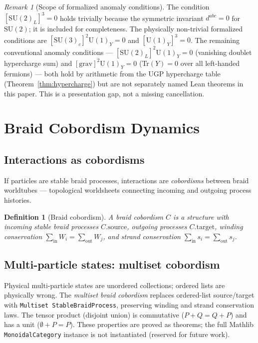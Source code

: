 \documentclass[12pt]{article}
\newtheorem{definition}[theorem]{Definition}
\theoremstyle{remark}
\newtheorem{remark}[theorem]{Remark}
\begin{document}
\begin{remark}[Scope of formalized anomaly conditions]
The condition $[\mathrm{SU}(2)_L]^3 = 0$ holds trivially because the symmetric
invariant $d^{abc} = 0$ for $\mathrm{SU}(2)$; it is included for completeness.
The physically non-trivial formalized conditions are
$[\mathrm{SU}(3)_c]^2 \mathrm{U}(1)_Y = 0$ and $[\mathrm{U}(1)_Y]^3 = 0$.
The remaining conventional anomaly conditions --- $[\mathrm{SU}(2)_L]^2
\mathrm{U}(1)_Y = 0$ (vanishing doublet hypercharge sum) and
$[\mathrm{grav}]^2 \mathrm{U}(1)_Y = 0$ (Tr$(Y) = 0$ over all left-handed
fermions) --- both hold by arithmetic from the UGP hypercharge table
(Theorem~\ref{thm:hypercharge}) but are not separately named Lean
theorems in this paper.  This is a presentation gap, not a missing cancellation.
\end{remark}

\section{Braid Cobordism Dynamics}
\label{sec:cobordism}

\subsection{Interactions as cobordisms}

If particles are stable braid processes, interactions are \emph{cobordisms}
between braid worldtubes --- topological worldsheets connecting incoming and
outgoing process histories.

\begin{definition}[Braid cobordism]
A \emph{braid cobordism} $C$ is a structure with incoming stable braid
processes $C.\text{source}$, outgoing processes $C.\text{target}$,
winding conservation $\sum_\text{in} W_i = \sum_\text{out} W_j$, and
strand conservation $\sum_\text{in} s_i = \sum_\text{out} s_j$.
\end{definition}

\subsection{Multi-particle states: multiset cobordism}

Physical multi-particle states are unordered collections; ordered lists are
physically wrong.  The \emph{multiset braid cobordism} replaces ordered-list
source/target with \texttt{Multiset StableBraidProcess}, preserving winding and
strand conservation laws.  The tensor product (disjoint union) is commutative
($P + Q = Q + P$) and has a unit ($\emptyset + P = P$).  These properties are
proved as theorems; the full Mathlib \texttt{MonoidalCategory} instance is not
instantiated (reserved for future work).
\end{document}

